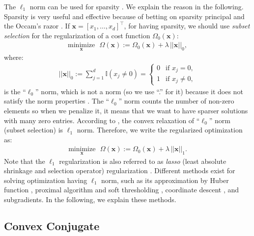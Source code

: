\documentclass[lang=cn,10pt]{gorgeousnbook}
\numberwithin{equation}{section}%
\numberwithin{figure}{section}%
\begin{document}
The $\ell_1$ norm can be used for sparsity \cite{ghojogh2019theory}. We explain the reason in the following. 
Sparsity is very useful and effective because of betting on sparsity principal \cite{friedman2001elements} and the  Occam's razor \cite{domingos1999role}. If $\boldsymbol{x} = [x_1, \dots, x_d]^\top$, for having sparsity, we should use \textit{subset selection} for the regularization of a cost function $\Omega_0(\boldsymbol{x})$:
\begin{align}\label{equation_regularization_optimization_l0}
\underset{\boldsymbol{x}}{\text{minimize}} ~~~ \Omega(\boldsymbol{x}) := \Omega_0(\boldsymbol{x}) + \lambda\, ||\boldsymbol{x}||_0,
\end{align}
where:
\begin{align}
||\boldsymbol{x}||_0 := \sum_{j=1}^d \mathbb{I}(x_j \neq 0) = 
\left\{
    \begin{array}{ll}
      0 & \text{if } x_j = 0, \\
      1 & \text{if } x_j \neq 0,
    \end{array}
\right.
\end{align}
is the ``$\ell_0$'' norm, which is not a norm (so we use ``.'' for it) because it does not satisfy the norm properties \cite{boyd2004convex}. The ``$\ell_0$'' norm counts the number of non-zero elements so when we penalize it, it means that we want to have sparser solutions with many zero entries.
According to \cite{donoho2006most}, the convex relaxation of ``$\ell_0$'' norm (subset selection) is $\ell_1$ norm. Therefore, we write the regularized optimization as:
\begin{align}\label{equation_regularization_optimization_l1}
\underset{\boldsymbol{x}}{\text{minimize}} ~~~ \Omega(\boldsymbol{x}) := \Omega_0(\boldsymbol{x}) + \lambda\, ||\boldsymbol{x}||_1.
\end{align}
Note that the $\ell_1$ regularization is also referred to as \textit{lasso} (least absolute shrinkage and selection operator) regularization \cite{tibshirani1996regression,hastie2019statistical}.
Different methods exist for solving optimization having $\ell_1$ norm, such as its approximation by Huber function \cite{huber1992robust}, proximal algorithm and soft thresholding \cite{parikh2014proximal}, coordinate descent \cite{wright2015coordinate,wu2008coordinate}, and subgradients. 
In the following, we explain these methods.

\subsection{Convex Conjugate}
\end{document}
